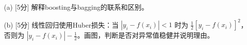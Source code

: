(a) [5分] 解释boosting与bagging的联系和区别。


(b) [5分] 线性回归使用Huber损失：当 \(|y_i-f(x_i)|<1\) 时为 \(\frac12[y_i-f(x_i)]^2\)，否则为 \(|y_i-f(x_i)|-\frac12\)。画图，判断是否对异常值稳健并说明理由。
